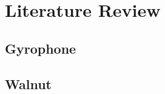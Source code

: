 \chapter{Literature Review}

\lipsum[1]
\lipsum[2]
\lipsum[3]

\section{Gyrophone}
\lipsum[4]

\section{Walnut}
\lipsum[4]
